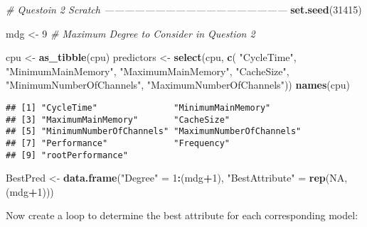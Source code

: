 \documentclass[12pt]{article}
\newenvironment{Shaded}{\begin{snugshade}}{\end{snugshade}}
\newcommand{\CommentTok}[1]{\textcolor[rgb]{0.56,0.35,0.01}{\textit{#1}}}
\newcommand{\DecValTok}[1]{\textcolor[rgb]{0.00,0.00,0.81}{#1}}
\newcommand{\KeywordTok}[1]{\textcolor[rgb]{0.13,0.29,0.53}{\textbf{#1}}}
\newcommand{\NormalTok}[1]{#1}
\newcommand{\OperatorTok}[1]{\textcolor[rgb]{0.81,0.36,0.00}{\textbf{#1}}}
\newcommand{\OtherTok}[1]{\textcolor[rgb]{0.56,0.35,0.01}{#1}}
\newcommand{\StringTok}[1]{\textcolor[rgb]{0.31,0.60,0.02}{#1}}
\begin{document}
\begin{Shaded}
\begin{Highlighting}[]
\CommentTok{# Questoin 2 Scratch ------------------------------------------------------}
\KeywordTok{set.seed}\NormalTok{(}\DecValTok{31415}\NormalTok{)}


\NormalTok{mdg <-}\StringTok{ }\DecValTok{9} \CommentTok{# Maximum Degree to Consider in Question 2}

\NormalTok{cpu <-}\StringTok{ }\KeywordTok{as_tibble}\NormalTok{(cpu)}
\NormalTok{predictors <-}\StringTok{ }\KeywordTok{select}\NormalTok{(cpu, }\KeywordTok{c}\NormalTok{( }\StringTok{"CycleTime"}\NormalTok{, }\StringTok{"MinimumMainMemory"}\NormalTok{, }\StringTok{"MaximumMainMemory"}\NormalTok{, }\StringTok{"CacheSize"}\NormalTok{, }\StringTok{"MinimumNumberOfChannels"}\NormalTok{, }\StringTok{"MaximumNumberOfChannels"}\NormalTok{))}
\KeywordTok{names}\NormalTok{(cpu)}
\end{Highlighting}
\end{Shaded}

\begin{verbatim}
## [1] "CycleTime"               "MinimumMainMemory"      
## [3] "MaximumMainMemory"       "CacheSize"              
## [5] "MinimumNumberOfChannels" "MaximumNumberOfChannels"
## [7] "Performance"             "Frequency"              
## [9] "rootPerformance"
\end{verbatim}

\begin{Shaded}
\begin{Highlighting}[]
\NormalTok{BestPred <-}\StringTok{ }\KeywordTok{data.frame}\NormalTok{(}\StringTok{"Degree"}\NormalTok{ =}\StringTok{ }\DecValTok{1}\OperatorTok{:}\NormalTok{(mdg}\OperatorTok{+}\DecValTok{1}\NormalTok{), }\StringTok{"BestAttribute"}\NormalTok{ =}\StringTok{ }\KeywordTok{rep}\NormalTok{(}\OtherTok{NA}\NormalTok{, (mdg}\OperatorTok{+}\DecValTok{1}\NormalTok{)))}
\end{Highlighting}
\end{Shaded}

Now create a loop to determine the best attribute for each corresponding
model:
\end{document}
